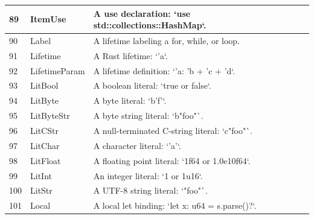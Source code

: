 \begin{longtable}{| p{} | p{} | p{} |}
89    & ItemUse                        & A use declaration: `use std::collections::HashMap`.                                                            \\ \hline
90    & Label                          & A lifetime labeling a for, while, or loop.                                                                     \\ \hline
91    & Lifetime                       & A Rust lifetime: `'a`.                                                                                         \\ \hline
92    & LifetimeParam                  & A lifetime definition: `'a: 'b + 'c + 'd`.                                                                     \\ \hline
93    & LitBool                        & A boolean literal: `true or false`.                                                                            \\ \hline
94    & LitByte                        & A byte literal: `b'f'`.                                                                                        \\ \hline
95    & LitByteStr                     & A byte string literal: `b"foo"`.                                                                               \\ \hline
96    & LitCStr                        & A null-terminated C-string literal: `c"foo"`.                                                                  \\ \hline
97    & LitChar                        & A character literal: `'a'`.                                                                                    \\ \hline
98    & LitFloat                       & A floating point literal: `1f64 or 1.0e10f64`.                                                                 \\ \hline
99    & LitInt                         & An integer literal: `1 or 1u16`.                                                                               \\ \hline
100   & LitStr                         & A UTF-8 string literal: `"foo"`.                                                                               \\ \hline
101   & Local                          & A local let binding: `let x: u64 = s.parse()?`.                                                                \\ \hline

\end{longtable}
